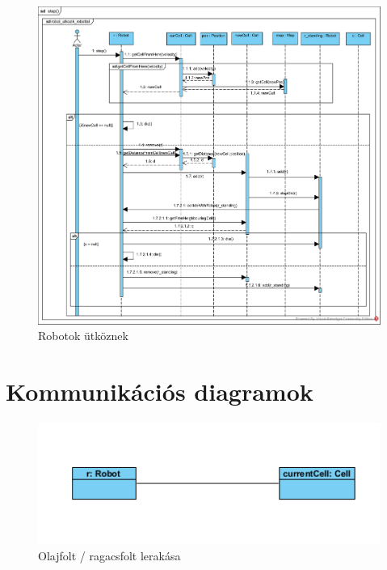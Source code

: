 \begin{figure}[!htbp]
	\begin{center}
		\includegraphics[width=18cm]{./chapters/chapter05/robot_collide_robot.png}
		\caption{Robotok ütköznek}

	\end{center}
\end{figure}

\clearpage

\section{Kommunikációs diagramok}

\begin{figure}[!htbp]
	\begin{center}
		\includegraphics[width=13cm]{./chapters/chapter05/placetrapobject.png}
		\caption{Olajfolt / ragacsfolt lerakása}
	\end{center}
\end{figure}

